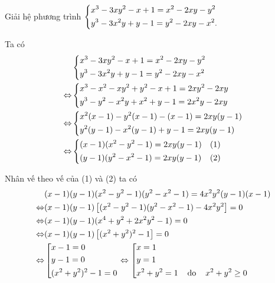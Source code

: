 \begin{ex}%
	Giải hệ phương trình $\left\{\begin{aligned}&x^3-3xy^2-x+1=x^2-2xy-y^2\\&y^3-3x^2y+y-1=y^2-2xy-x^2.\end{aligned}\right.$
	\loigiai 
	{
		Ta có
		\begin{align*}
		&\left\{\begin{aligned}&x^3-3xy^2-x+1=x^2-2xy-y^2\\&y^3-3x^2y+y-1=y^2-2xy-x^2\end{aligned}\right. \\
		\Leftrightarrow &\left\{\begin{aligned}&x^3-x^2-xy^2+y^2-x+1=2xy^2-2xy\\&y^3-y^2-x^2y+x^2+y-1=2x^2y-2xy\end{aligned}\right. \\
		\Leftrightarrow &\left\{\begin{aligned}&x^2(x-1)-y^2(x-1)-(x-1)=2xy(y-1)\\&y^2(y-1)-x^2(y-1)+y-1=2xy(y-1)\end{aligned}\right.\\
		\Leftrightarrow &\left\{\begin{aligned}&(x-1)(x^2-y^2-1)=2xy(y-1) &(1) \\ &(y-1)(y^2-x^2-1)=2xy(y-1) &(2)\end{aligned}\right.
		\end{align*}
		
		Nhân vế theo vế của (1) và (2) ta có
		\begin{align*}
		&(x-1)(y-1)(x^2-y^2-1)(y^2-x^2-1)=4x^2y^2(y-1)(x-1)\\  
		\Leftrightarrow &(x-1)(y-1) \left[ (x^2-y^2-1)(y^2-x^2-1) - 4x^2y^2 \right] =0 \\
		\Leftrightarrow &(x-1)(y-1) (x^4+y^2+2x^2y^2-1) =0 \\
		\Leftrightarrow &(x-1)(y-1) \left[(x^2+y^2)^2-1\right] =0 \\ 
		\Leftrightarrow &\left[\begin{aligned}&x-1=0\\&y-1=0\\&(x^2+y^2)^2-1=0\end{aligned}\right.
		\Leftrightarrow \left[\begin{aligned}&x=1\\&y=1\\&x^2+y^2=1 \hspace{0.4cm} \text{do} \hspace{0.4cm} x^2+y^2 \ge 0\end{aligned}\right.
		\end{align*}
		
}
\end{ex}
